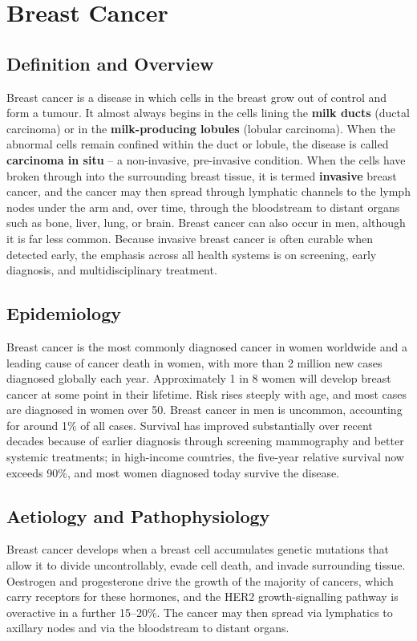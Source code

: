 \chapter{Breast Cancer}

\section*{Definition and Overview}
Breast cancer is a disease in which cells in the breast grow out of control and form a tumour. It almost always begins in the cells lining the \textbf{milk ducts} (ductal carcinoma) or in the \textbf{milk-producing lobules} (lobular carcinoma). When the abnormal cells remain confined within the duct or lobule, the disease is called \textbf{carcinoma in situ} -- a non-invasive, pre-invasive condition. When the cells have broken through into the surrounding breast tissue, it is termed \textbf{invasive} breast cancer, and the cancer may then spread through lymphatic channels to the lymph nodes under the arm and, over time, through the bloodstream to distant organs such as bone, liver, lung, or brain. Breast cancer can also occur in men, although it is far less common. Because invasive breast cancer is often curable when detected early, the emphasis across all health systems is on screening, early diagnosis, and multidisciplinary treatment.

\section*{Epidemiology}
Breast cancer is the most commonly diagnosed cancer in women worldwide and a leading cause of cancer death in women, with more than 2 million new cases diagnosed globally each year. Approximately 1 in 8 women will develop breast cancer at some point in their lifetime. Risk rises steeply with age, and most cases are diagnosed in women over 50. Breast cancer in men is uncommon, accounting for around 1\% of all cases. Survival has improved substantially over recent decades because of earlier diagnosis through screening mammography and better systemic treatments; in high-income countries, the five-year relative survival now exceeds 90\%, and most women diagnosed today survive the disease.

\section*{Aetiology and Pathophysiology}
Breast cancer develops when a breast cell accumulates genetic mutations that allow it to divide uncontrollably, evade cell death, and invade surrounding tissue. Oestrogen and progesterone drive the growth of the majority of cancers, which carry receptors for these hormones, and the HER2 growth-signalling pathway is overactive in a further 15--20\%. The cancer may then spread via lymphatics to axillary nodes and via the bloodstream to distant organs.

